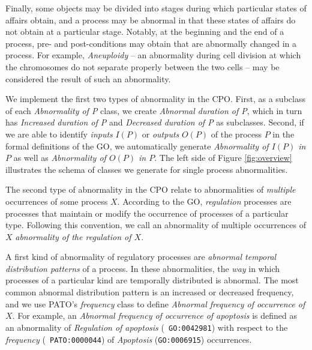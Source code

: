 \documentclass{bioinfo}
\begin{document}
Finally, some objects may be divided into stages during which
particular states of affairs obtain, and a process may be abnormal in
that these states of affairs do not obtain at a particular
stage. Notably, at the beginning and the end of a process, pre- and
post-conditions may obtain that are abnormally changed in a
process. For example, {\em Aneuploidy} -- an abnormality during cell
division at which the chromosomes do not separate properly between the
two cells -- may be considered the result of such an abnormality.

We implement the first two types of abnormality in the CPO. First, as
a subclass of each {\em Abnormality of P} class, we create {\em
  Abnormal duration of P}, which in turn has {\em Increased duration
  of P} and {\em Decreased duration of P} as subclasses. Second, if we
are able to identify {\em inputs} $I(P)$ or {\em outputs} $O(P)$ of
the process $P$ in the formal definitions of the GO, we automatically
generate {\em Abnormality of $I(P)$ in $P$} as well as {\em
  Abnormality of $O(P)$ in $P$}.  The left side of Figure
\ref{fig:overview} illustrates the schema of classes we generate for
single process abnormalities.

The second type of abnormality in the CPO relate to abnormalities of
{\em multiple} occurrences of some process $X$. According to the GO,
{\em regulation} processes are processes that maintain or modify the
occurrence of processes of a particular type. Following this
convention, we call an abnormality of multiple occurrences of $X$ {\em
  abnormality of the regulation of $X$}.

A first kind of abnormality of regulatory processes are {\em abnormal
  temporal distribution patterns} of a process. In these
abnormalities, the {\em way} in which processes of a particular kind
are temporally distributed is abnormal.  The most common abnormal
distribution pattern is an increased or decreased frequency, and we
use PATO's {\em frequency} class to define {\em Abnormal frequency of
  occurrence of $X$}.
For example, an {\em Abnormal frequency of occurrence of apoptosis} is
defined as an abnormality of {\em Regulation of apoptosis} ({\tt
  GO:0042981}) with respect to the {\em frequency} ({\tt
  PATO:0000044}) of {\em Apoptosis} ({\tt GO:0006915}) occurrences.
\end{document}

